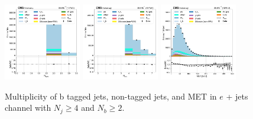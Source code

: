 \begin{figure}[htb!]
    \centering
    \includegraphics[width=0.3\textwidth]{chapters/Appendix/sectionPlots/figures/data_mc_overlays/ejet_2016_cat_gt4_gt2_signal_linear_jet_n_bjets}
    \includegraphics[width=0.3\textwidth]{chapters/Appendix/sectionPlots/figures/data_mc_overlays/ejet_2016_cat_gt4_gt2_signal_linear_jet_n_jets}
    \includegraphics[width=0.3\textwidth]{chapters/Appendix/sectionPlots/figures/data_mc_overlays/ejet_2016_cat_gt4_gt2_signal_linear_misc_met_mag}
    \caption{Multiplicity of b tagged jets, non-tagged jets, and MET in
    $e$ + jets channel with $N_{j} \geq 4$ and $N_{b} \geq 2$.
    \label{fig:ejet_2_jetmet}}
\end{figure}
